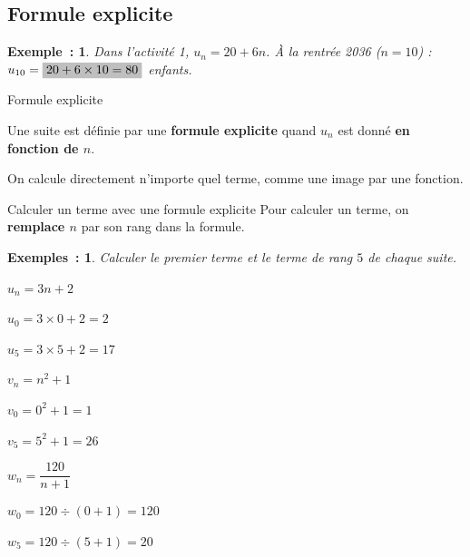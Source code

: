 \documentclass[12pt]{article}
\theoremstyle{break}
\newtheorem*{example}{Exemple~:}
\newtheorem*{examples}{Exemples~:}
\theoremstyle{inline}
\begin{document}
\subsection{Formule explicite}

\begin{example}
  Dans l'activité 1, $u_n = 20 + 6n$. À la rentrée 2036 ($n = 10$) : $u_{10} = \hideM{20 + 6 \times 10 = 80}$ enfants.
\end{example}

\begin{definition}{Formule explicite}{}
  \begin{multihide}
    Une suite est définie par une \textbf{formule explicite} quand $u_n$ est donné \textbf{en fonction de $n$}.

    On calcule directement n'importe quel terme, comme une image par une fonction.
  \end{multihide}
\end{definition}

\begin{method}{Calculer un terme avec une formule explicite}{}
  Pour calculer un terme, on \textbf{remplace $n$} par son rang dans la formule.
\end{method}

\begin{examples}
  Calculer le premier terme et le terme de rang $5$ de chaque suite.

  \medskip
  \begin{minipage}[t]{0.31\linewidth}
    $u_n = 3n + 2$
    \begin{multihideW}[1em]
      $u_0 = 3 \times 0 + 2 = 2$

      $u_5 = 3 \times 5 + 2 = 17$
    \end{multihideW}
  \end{minipage}
  \hfill
  \begin{minipage}[t]{0.31\linewidth}
    $v_n = n^2 + 1$
    \begin{multihideW}[1em]
      $v_0 = 0^2 + 1 = 1$

      $v_5 = 5^2 + 1 = 26$
    \end{multihideW}
  \end{minipage}
  \hfill
  \begin{minipage}[t]{0.31\linewidth}
    $w_n = \dfrac{120}{n + 1}$
    \begin{multihideW}[1em]
      $w_0 = 120 \div (0 + 1) = 120$

      $w_5 = 120 \div (5 + 1) = 20$
    \end{multihideW}
  \end{minipage}
\end{examples}
\end{document}
